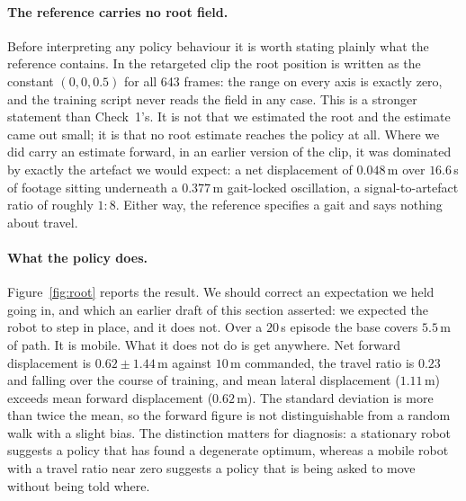 \documentclass{article}
\theoremstyle{plain}
\theoremstyle{definition}
\theoremstyle{remark}
\begin{document}
\paragraph{The reference carries no root field.} Before interpreting any
policy behaviour it is worth stating plainly what the reference contains. In
the retargeted clip the root position is written as the constant
$(0, 0, 0.5)$ for all 643 frames: the range on every axis is exactly zero, and
the training script never reads the field in any case. This is a stronger
statement than Check~1's. It is not that we estimated the root and the
estimate came out small; it is that no root estimate reaches the policy at
all. Where we did carry an estimate forward, in an earlier version of the
clip, it was dominated by exactly the artefact we would expect: a net
displacement of $0.048$\,m over $16.6$\,s of footage sitting underneath a
$0.377$\,m gait-locked oscillation, a signal-to-artefact ratio of roughly
$1{:}8$. Either way, the reference specifies a gait and says nothing about
travel.

\paragraph{What the policy does.} Figure~\ref{fig:root} reports the result. We
should correct an expectation we held going in, and which an earlier draft of
this section asserted: we expected the robot to step in place, and it does
not. Over a $20$\,s episode the base covers $5.5$\,m of path. It is mobile.
What it does not do is get anywhere. Net forward displacement is
$0.62 \pm 1.44$\,m against $10$\,m commanded, the travel ratio is $0.23$ and
falling over the course of training, and mean lateral displacement
($1.11$\,m) exceeds mean forward displacement ($0.62$\,m). The standard
deviation is more than twice the mean, so the forward figure is not
distinguishable from a random walk with a slight bias. The distinction
matters for diagnosis: a stationary robot suggests a policy that has found a
degenerate optimum, whereas a mobile robot with a travel ratio near zero
suggests a policy that is being asked to move without being told where.
\end{document}
